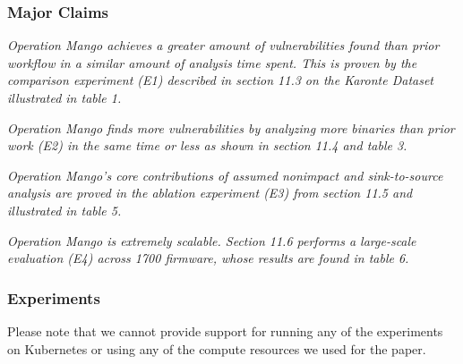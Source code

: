 \subsubsection{Major Claims}
\begin{compactdesc}

    \item[(C1):] \textit{Operation Mango achieves a greater amount of vulnerabilities found than prior workflow in a similar amount of analysis time spent.
    This is proven by the comparison experiment (E1) described in section 11.3 on the Karonte Dataset illustrated in table 1.}

    \item[(C2):] \textit{Operation Mango finds more vulnerabilities by analyzing more binaries than prior work (E2) in the same time or less as shown in section 11.4 and table 3.}

    \item[(C3):] \textit{Operation Mango's core contributions of assumed nonimpact and sink-to-source analysis are proved in the ablation experiment (E3) from section 11.5 and illustrated in table 5.}

    \item[(C4):] \textit{Operation Mango is extremely scalable. Section 11.6 performs a large-scale evaluation (E4) across 1700 firmware, whose results are found in table 6.}

\end{compactdesc}

\subsubsection{Experiments}
Please note that we cannot provide support for running any of the experiments on Kubernetes or using any of the compute resources we used for the paper.

